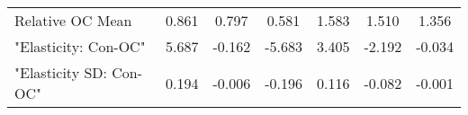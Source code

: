 \begin{tabular}{rrrrrrr}
\multicolumn{1}{l}{Relative OC Mean} & \multicolumn{1}{c}{0.861} & \multicolumn{1}{c}{0.797} & \multicolumn{1}{c}{0.581} & \multicolumn{1}{c}{1.583} & \multicolumn{1}{c}{1.510} & \multicolumn{1}{c}{1.356} \\
\multicolumn{1}{l}{"Elasticity: Con-OC"} & \multicolumn{1}{c}{5.687} & \multicolumn{1}{c}{-0.162} & \multicolumn{1}{c}{-5.683} & \multicolumn{1}{c}{3.405} & \multicolumn{1}{c}{-2.192} & \multicolumn{1}{c}{-0.034} \\
\multicolumn{1}{l}{"Elasticity SD: Con-OC"} & \multicolumn{1}{c}{0.194} & \multicolumn{1}{c}{-0.006} & \multicolumn{1}{c}{-0.196} & \multicolumn{1}{c}{0.116} & \multicolumn{1}{c}{-0.082} & \multicolumn{1}{c}{-0.001} \\
\bottomrule
\end{tabular}%
